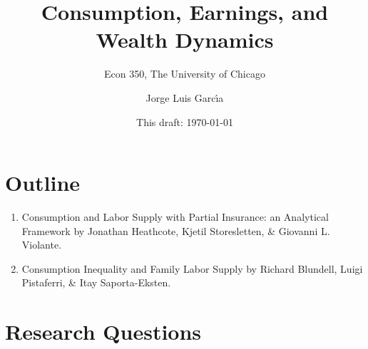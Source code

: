 \documentclass[notes=show]{beamer}
\begin{document}
\title[]{{\tiny Consumption, Earnings, and Wealth Dynamics}}
\subtitle{{\tiny Econ 350, The University of Chicago}}
\author[]{{\tiny Jorge Luis Garc\'{\i}a}}
\institute{}
\date{{\tiny This draft: \today}}
\maketitle

\section{Outline}

\begin{frame}%


\begin{enumerate}
\item Consumption and Labor Supply with Partial Insurance: an Analytical
Framework by Jonathan Heathcote, Kjetil Storesletten, \& Giovanni L.
Violante.

\item Consumption Inequality and Family Labor Supply by Richard Blundell,
Luigi Pistaferri, \& Itay Saporta-Eksten.
\end{enumerate}

\transboxout%
\end{frame}%

\bigskip

\section{Research Questions}
\end{document}
